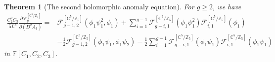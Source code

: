 \documentclass[12pt]{amsart}
\newtheorem{thm}[prop]{Theorem}
\numberwithin{equation}{section}
\begin{document}
\begin{thm}[The second holomorphic anomaly equation]\label{thm:2nd_HAE}
For $g\geq{2}$, we have
\begin{equation*}
\begin{aligned}
\frac{C_2^2C_3}{5L^3}\frac{\partial\mathcal{F}_{g}^{\left[\mathbb{C}^{5} / \mathbb{Z}_{5}\right]}}{\partial (D^2A_1)}
=&\mathcal{F}_{g-1,2}^{\left[\mathbb{C}^5 / \mathbb{Z}_5\right]}\left(\phi_1\psi_1^2,\phi_1\right)+\sum_{i=1}^{g-1}\mathcal{F}_{g-i,1}^{\left[\mathbb{C}^5 / \mathbb{Z}_5\right]}\left(\phi_1\psi_1^2\right)\mathcal{F}_{i,1}^{\left[\mathbb{C}^5 / \mathbb{Z}_5\right]}\left(\phi_1\right)\\
&-\frac{1}{2}\mathcal{F}_{g-1,2}^{\left[\mathbb{C}^5 / \mathbb{Z}_5\right]}\left(\phi_1\psi_1,\phi_1\psi_2\right) -\frac{1}{2}\sum_{i=1}^{g-1}\mathcal{F}_{g-i,1}^{\left[\mathbb{C}^5 / \mathbb{Z}_5\right]}\left(\phi_1\psi_1\right)\mathcal{F}_{i,1}^{\left[\mathbb{C}^5 / \mathbb{Z}_5\right]}\left(\phi_1\psi_1\right)  
\end{aligned}
\end{equation*}
in $\mathbb{F}[C_1,C_2,C_3]$.
\end{thm}
\end{document}

